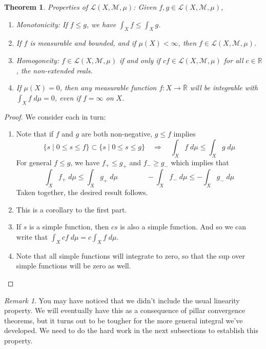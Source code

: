 \documentclass[12pt]{article}
\theoremstyle{plain}
\newtheorem{thm}{Theorem}[subsection]
\theoremstyle{definition}
\theoremstyle{remark}
\newtheorem*{rmk}{Remark}
\begin{document}
\begin{thm} 
\label{lebprops}    
\emph{Properties of $\mathscr{L}(X,\mathscr{M}, \mu)$:} Given $f,g\in\mathscr{L}(X,\mathscr{M},\mu)$,
    
    \begin{enumerate}
        \item {Monotonicity}: If $f\leq g$, we have $\int_X f \leq\int_X g$.
        \item If $f$ is measurable and bounded, and if $\mu(X)<\infty$, then $f\in\mathscr{L}(X,\mathscr{M},\mu)$.
        \item {Homogoneity}: $f\in\mathscr{L}(X,\mathscr{M},\mu)$ if and only if $cf\in\mathscr{L}(X,\mathscr{M},\mu)$ for all $c\in\mathbb{R}$, the non-extended reals.
        \item If $\mu(X)=0$, then \emph{any} measurable function $f: X\rightarrow\bar{\mathbb{R}}$ will be integrable with $\int_X f \; d\mu=0$, even if $f=\infty$ on $X$.
    \end{enumerate}
\end{thm}
\begin{proof} We consider each in turn:
\begin{enumerate} 

    \item Note that if $f$ and $g$ are both non-negative, $g\leq f$ implies
\[
    \{ s \; | \; 0\leq s\leq f \} \subset
    \{ s \; | \; 0\leq s\leq g \}  \quad\Rightarrow\quad
    \int_X f \; d\mu \leq
    \int_X g \; d\mu 
\]
For general $f\leq g$, we have $f_+ \leq g_+$ and $f_- \geq g_-$ which implies that 
\[
    \int_X f_+ \; d\mu \leq 
    \int_X g_+ \; d\mu
    \qquad\qquad 
    -\int_X f_- \; d\mu \leq 
    -\int_X g_- \; d\mu
\]
Taken together, the desired result follows.

    \item This is a corollary to the first part.  
        
    \item If $s$ is a simple function, then $cs$ is also a simple function. And so we can write that $\int_X cf \; d\mu = c\int_X f \; d\mu$.
        
    \item Note that all simple functions will integrate to zero, so that the sup over simple functions will be zero as well.
\end{enumerate}
\end{proof}

\begin{rmk}
You may have noticed that we didn't include the usual linearity property. We will eventually have this as a consequence of pillar convergence theorems, but it turns out to be tougher for the more general integral we've developed. We need to do the hard work in the next subsections to establish this property.
\end{rmk}
\end{document}
